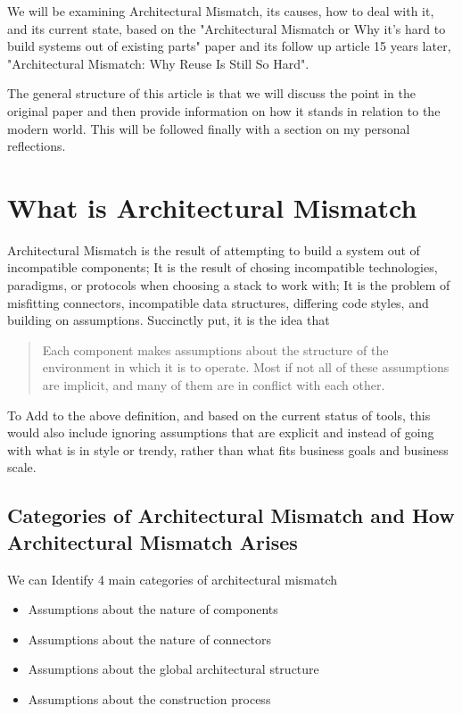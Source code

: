 \documentclass[14pt]{article}
\begin{document}
We will be examining Architectural Mismatch, its causes, how to deal with it, 
and its current state, based on the  "Architectural Mismatch
or Why it’s hard to build systems out of existing parts"  paper and its follow up
article 15 years later,  "Architectural Mismatch: Why Reuse Is Still So Hard".

The general structure of this article is that we will discuss the point in the original paper 
and then provide information on how it stands in relation to the modern world. This will be followed
finally with a section on my personal reflections.
\newpage
\section{What is Architectural Mismatch}
Architectural Mismatch is the result of attempting to build a system out of incompatible
components; It is the result of chosing incompatible technologies, paradigms, or protocols
when choosing a stack to work with; It is the problem of misfitting connectors, incompatible 
data structures, differing code styles, and building on assumptions. Succinctly put, it is the
idea that
\begin{quote}
Each component makes assumptions about the  structure of the environment in which
it is to operate. Most if not all of these assumptions are implicit,
and many of them are in conflict with each other.
\end{quote}

To Add to the above definition, and based on the current status of tools, this would also include
ignoring assumptions that are explicit and instead of going with what is in style or trendy, rather
than what fits business goals and business scale.
\subsection{Categories of Architectural Mismatch and How Architectural Mismatch Arises}
We can Identify 4  main categories of architectural mismatch
\begin{itemize}
  \item Assumptions about the nature of components
  \item Assumptions about the nature of connectors
  \item Assumptions about the global architectural structure
  \item Assumptions about the construction process
\end{itemize}
\end{document}
